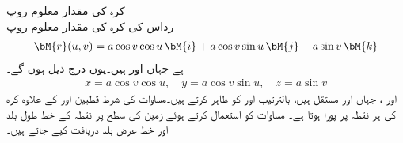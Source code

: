 \quad کرہ کی مقدار معلوم روپ\\
رداس  کی کرہ کی مقدار معلوم روپ
\begin{align}\label{مساوات_خطی_تکمل_خطوط_عرض_بلد_طول_بلد}
\bM{r}(u,v)=a\cos v\cos u \,\bM{i}+a\cos v \sin u \,\bM{j}+a\sin v \,\bM{k}
\end{align}
ہے جہاں  اور  ہیں۔یوں درج ذیل ہوں گے۔
\begin{align*}
x=a\cos v\cos u,\quad y=a\cos v\sin u,\quad z=a\sin v
\end{align*}
  اور  ، جہاں  اور  مستقل ہیں، بالترتیب  اور  کو ظاہر کرتے ہیں۔مساوات  کی شرط قطبین  اور  کے علاوہ کرہ کی ہر نقطہ پر پورا ہوتا ہے۔ مساوات  کو استعمال کرتے ہوئے زمین کی سطح پر نقطہ کے   خط طول بلد اور خط عرض بلد دریافت کیے جاتے ہیں۔


